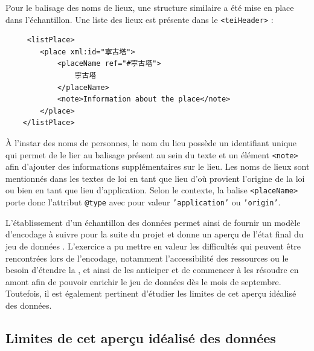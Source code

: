 Pour le balisage des noms de lieux, une structure similaire a été mise en place dans l'échantillon. Une liste des lieux est présente dans le \texttt{<teiHeader>} : 
\begin{verbatim}
     <listPlace>
        <place xml:id="寧古塔">
            <placeName ref="#寧古塔">
                寧古塔
            </placeName>
            <note>Information about the place</note>
        </place>
    </listPlace>
\end{verbatim}
À l'instar des noms de personnes, le nom du lieu possède un identifiant unique qui permet de le lier au balisage présent au sein du texte et un élément \texttt{<note>} afin d'ajouter des informations supplémentaires sur le lieu. Les noms de lieux sont mentionnés dans les textes de loi en tant que lieu d'où provient l'origine de la loi ou bien en tant que lieu d'application. Selon le contexte, la balise \texttt{<placeName>} porte donc l'attribut \texttt{@type} avec pour valeur \texttt{'application'} ou \texttt{'origin'}. 

L'établissement d'un échantillon des données permet ainsi de fournir un modèle d'encodage à suivre pour la suite du projet et donne un aperçu de l'état final du jeu de données \TEI. L'exercice a pu mettre en valeur les difficultés qui peuvent être rencontrées lors de l'encodage, notamment l'accessibilité des ressources ou le besoin d'étendre la \TEI, et ainsi de les anticiper et de commencer à les résoudre en amont afin de pouvoir enrichir le jeu de données dès le mois de septembre. Toutefois, il est également pertinent d'étudier les limites de cet aperçu idéalisé des données.

\subsection{Limites de cet aperçu idéalisé des données}

